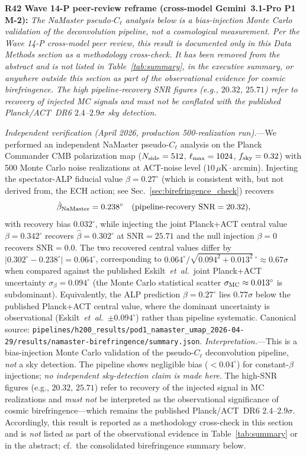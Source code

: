 \documentclass[aps,prd,twocolumn,superscriptaddress,showpacs,preprintnumbers,nofootinbib,longbibliography,floatfix]{revtex4-2}
\newcommand{\etal}{\textit{et~al.}}
\begin{document}
\noindent\textbf{R42 Wave 14-P peer-review reframe (cross-model Gemini~3.1-Pro P1 M-2):} \emph{The NaMaster pseudo-$C_\ell$ analysis below is a bias-injection Monte Carlo validation of the deconvolution pipeline, not a cosmological measurement. Per the Wave 14-P cross-model peer review, this result is documented only in this Data Methods section as a methodology cross-check. It has been removed from the abstract and is not listed in Table~\ref{tab:summary}, in the executive summary, or anywhere outside this section as part of the observational evidence for cosmic birefringence. The high pipeline-recovery SNR figures (e.g., $20.32$, $25.71$) refer to recovery of injected MC signals and \emph{must not} be conflated with the published Planck/ACT~DR6 $2.4$--$2.9\sigma$ sky detection.}

\textit{Independent verification (April 2026, production 500-realization run).}---We performed an independent NaMaster pseudo-$C_\ell$ analysis on the Planck Commander CMB polarization map ($N_{\rm side}=512$, $\ell_{\rm max}=1024$, $f_{\rm sky}=0.32$) with 500 Monte Carlo noise realizations at ACT-noise level ($10\,\mu\mathrm{K\cdot arcmin}$). Injecting the spectator-ALP fiducial value $\beta=0.27^\circ$ (which is consistent with, but not derived from, the ECH action; see Sec.~\ref{sec:birefringence_check}) recovers
\begin{equation}
  \hat\beta_{\rm NaMaster} = 0.238^\circ \quad (\text{pipeline-recovery SNR}=20.32),
  \label{eq:beta_namaster}
\end{equation}
with recovery bias $0.032^\circ$, while injecting the joint Planck+ACT central value $\beta=0.342^\circ$ recovers $\hat\beta = 0.302^\circ$ at SNR$=25.71$ and the null injection $\beta=0$ recovers SNR$=0.0$. The two recovered central values differ by $|0.302^\circ - 0.238^\circ| = 0.064^\circ$, corresponding to $0.064^\circ / \sqrt{0.094^2 + 0.013^2}\,^\circ \approx 0.67\sigma$ when compared against the published Eskilt~\etal\ joint Planck+ACT uncertainty $\sigma_\beta = 0.094^\circ$ (the Monte Carlo statistical scatter $\sigma_{\rm MC} \approx 0.013^\circ$ is subdominant). Equivalently, the ALP prediction $\beta = 0.27^\circ$ lies $0.77\sigma$ below the published Planck+ACT central value, where the dominant uncertainty is observational (Eskilt~\etal\ $\pm 0.094^\circ$) rather than pipeline systematic. Canonical source: \texttt{pipelines/h200\_results/pod1\_namaster\_umap\_2026-04-29/results/namaster-birefringence/summary.json}. \emph{Interpretation.}---This is a bias-injection Monte Carlo validation of the pseudo-$C_\ell$ deconvolution pipeline, \emph{not} a sky detection. The pipeline shows negligible bias ($<0.04^\circ$) for constant-$\beta$ injections; \emph{no independent sky-detection claim is made here}. The high-SNR figures (e.g., $20.32$, $25.71$) refer to recovery of the injected signal in MC realizations and \emph{must not} be interpreted as the observational significance of cosmic birefringence---which remains the published Planck/ACT~DR6 $2.4$--$2.9\sigma$. Accordingly, this result is reported as a methodology cross-check in this section and is \emph{not} listed as part of the observational evidence in Table~\ref{tab:summary} or in the abstract; cf.\ the consolidated birefringence summary below.
\end{document}
